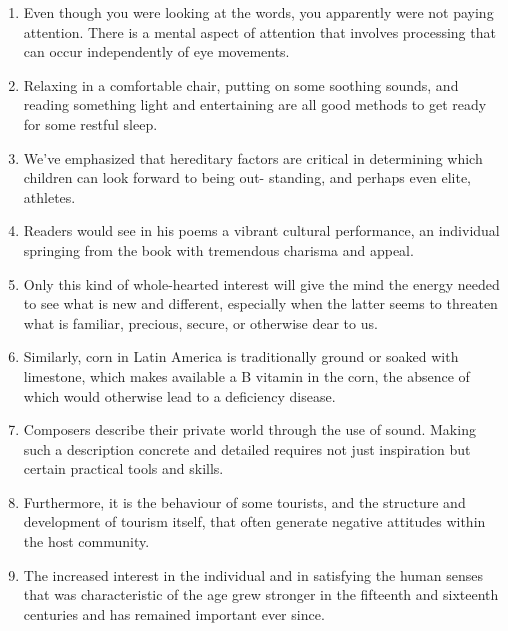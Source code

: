 \documentclass[9pt, a4paper, twocolumn]{oblivoir}
\begin{document}
    \begin{enumerate}
        \item Even though you were looking at the words, you apparently were not paying attention. There is a mental aspect of
        attention that involves processing that can occur independently of eye movements.
        \item Relaxing in a comfortable chair, putting on some soothing sounds, and reading something light and entertaining are all
        good methods to get ready for some restful sleep.
        \item We’ve emphasized that hereditary factors are critical in determining which children can look forward to being out-
        standing, and perhaps even elite, athletes.
        \item Readers would see in his poems a vibrant cultural performance, an individual springing from the book with tremendous
        charisma and appeal.
        \item Only this kind of whole-hearted interest will give the mind the energy needed to see what is new and different,
        especially when the latter seems to threaten what is familiar, precious, secure, or otherwise dear to us.
        \item Similarly, corn in Latin America is traditionally ground or soaked with limestone, which makes available a
        B vitamin in the corn, the absence of which would otherwise lead to a deficiency disease.
        \item Composers describe their private world through the use of sound. Making such a description concrete and
        detailed requires not just inspiration but certain practical tools and skills.
        \item Furthermore, it is the behaviour of some tourists, and the structure and development of tourism itself, that often generate negative attitudes within the host community. 
        \item The increased interest in the individual and in satisfying the human senses that was characteristic of the age
        grew stronger in the fifteenth and sixteenth centuries and has remained important ever since.
    \end{enumerate}
\end{document}
